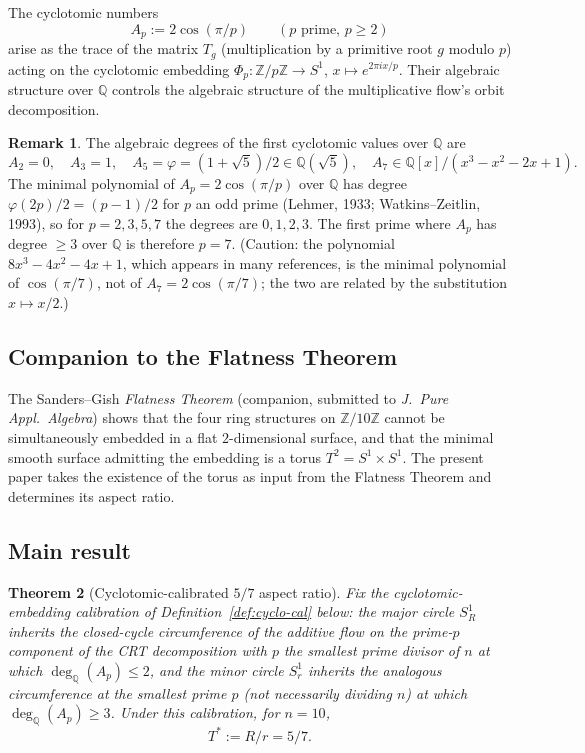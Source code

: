 \documentclass[11pt,reqno]{amsart}
\theoremstyle{plain}
\newtheorem{theorem}{Theorem}
\theoremstyle{definition}
\newtheorem{remark}[theorem]{Remark}
\newcommand{\Z}{\mathbb{Z}}
\newcommand{\Q}{\mathbb{Q}}
\newcommand{\Tstar}{T^{*}}
\begin{document}
The cyclotomic numbers
\[
A_p := 2 \cos(\pi/p) \qquad (p \text{ prime}, \, p \geq 2)
\]
arise as the trace of the matrix $T_g$ (multiplication by a primitive root $g$ modulo $p$) acting on the cyclotomic embedding $\Phi_p \colon \Z/p\Z \to S^1$, $x \mapsto e^{2\pi i x/p}$. Their algebraic structure over $\Q$ controls the algebraic structure of the multiplicative flow's orbit decomposition.

\begin{remark}
The algebraic degrees of the first cyclotomic values over $\Q$ are
\[
A_2 = 0,\quad A_3 = 1,\quad A_5 = \varphi = (1+\sqrt 5)/2 \in \Q(\sqrt 5),\quad A_7 \in \Q[x]/(x^3 - x^2 - 2x + 1).
\]
The minimal polynomial of $A_p = 2\cos(\pi/p)$ over $\Q$ has degree $\varphi(2p)/2 = (p-1)/2$ for $p$ an odd prime (Lehmer, 1933; Watkins--Zeitlin, 1993), so for $p = 2,3,5,7$ the degrees are $0, 1, 2, 3$. The first prime where $A_p$ has degree $\ge 3$ over $\Q$ is therefore $p = 7$. (Caution: the polynomial $8x^{3} - 4x^{2} - 4x + 1$, which appears in many references, is the minimal polynomial of $\cos(\pi/7)$, not of $A_7 = 2\cos(\pi/7)$; the two are related by the substitution $x \mapsto x/2$.)
\end{remark}

\subsection{Companion to the Flatness Theorem}

The Sanders--Gish \emph{Flatness Theorem} (companion, submitted to \emph{J.\ Pure Appl.\ Algebra}) shows that the four ring structures on $\Z/10\Z$ cannot be simultaneously embedded in a flat $2$-dimensional surface, and that the minimal smooth surface admitting the embedding is a torus $T^2 = S^1 \times S^1$. The present paper takes the existence of the torus as input from the Flatness Theorem and determines its aspect ratio.

\subsection{Main result}

\begin{theorem}[Cyclotomic-calibrated $5/7$ aspect ratio] \label{thm:forced57}
Fix the cyclotomic-embedding calibration of Definition~\ref{def:cyclo-cal} below: the major circle $S^{1}_{R}$ inherits the closed-cycle circumference of the additive flow on the prime-$p$ component of the CRT decomposition with $p$ the smallest prime divisor of $n$ at which $\deg_{\Q}(A_{p}) \le 2$, and the minor circle $S^{1}_{r}$ inherits the analogous circumference at the smallest prime $p$ (not necessarily dividing $n$) at which $\deg_{\Q}(A_{p}) \ge 3$. Under this calibration, for $n = 10$,
\[
\Tstar := R/r = 5/7.
\]
\end{theorem}
\end{document}
